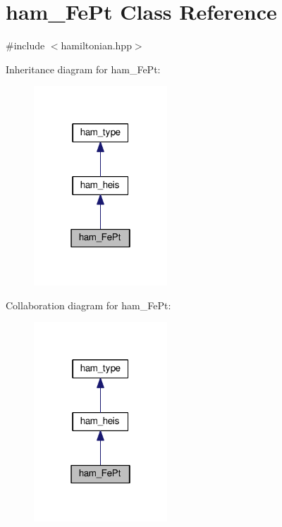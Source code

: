 \hypertarget{classham__FePt}{}\section{ham\+\_\+\+Fe\+Pt Class Reference}
\label{classham__FePt}


{\ttfamily \#include $<$hamiltonian.\+hpp$>$}



Inheritance diagram for ham\+\_\+\+Fe\+Pt\+:\nopagebreak
\begin{figure}[H]
\begin{center}
\leavevmode
\includegraphics[width=142pt]{da/d70/classham__FePt__inherit__graph}
\end{center}
\end{figure}


Collaboration diagram for ham\+\_\+\+Fe\+Pt\+:\nopagebreak
\begin{figure}[H]
\begin{center}
\leavevmode
\includegraphics[width=142pt]{d8/d56/classham__FePt__coll__graph}
\end{center}
\end{figure}
